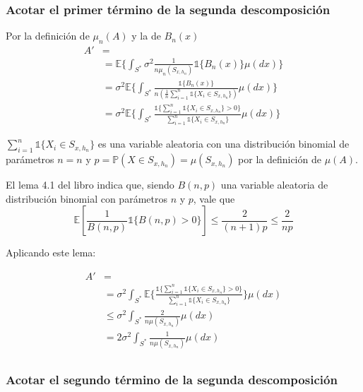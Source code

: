 \documentclass[12pt, a4paper]{article}
\begin{document}
\subsubsection{Acotar el primer término de la segunda descomposición}
Por la definición de $\mu_n(A)$ y la de $B_n(x)$
$$
\begin{aligned}
  A' &= \\
  &=\mathds{E} \Bigg\{ \int_{S^{*}} \sigma^2 \frac{ 1 }{n \mu_n(S_{x,h_n})} \mathds{1} \{ B_n(x)\} \mu(dx) \Bigg\} \\
  &=\sigma^2 \mathds{E} \Bigg\{ \int_{S^{*}}  \frac{ \mathds{1} \{ B_n(x)\} }{n (\frac{1}{n} \sum_{i=1}^n \mathds{1}\{ X_i \in S_{x,h_n} \})}  \mu(dx) \Bigg\} \\
  &=\sigma^2 \mathds{E} \Bigg\{ \int_{S^{*}}  \frac{ \mathds{1} \{ 
    \sum_{i=1}^n \mathds{1}\{ X_i \in S_{x,h_n} \}>0  
  \} }{ \sum_{i=1}^n \mathds{1}\{ X_i \in S_{x,h_n} \}}  \mu(dx) \Bigg\}
\end{aligned}
$$

$\sum_{i=1}^n \mathds{1}\{ X_i \in S_{x,h_n} \}$ es una variable aleatoria con una distribución binomial de parámetros $n=n$ y $p=\mathds{P}( X \in S_{x,h_n} )=\mu(S_{x,h_n})$ por la definición de $\mu(A)$.

El lema 4.1 del libro indica que, siendo $B(n,p)$ una variable aleatoria de distribución binomial con parámetros $n$ y $p$, vale que 
$$
\mathds{E}[\frac{1}{B(n,p)} \mathds{1} \{ B(n,p)>0 \}] \leq \frac{2}{(n+1)p} \leq \frac{2}{np}
$$

Aplicando este lema:

$$
\begin{aligned}
  A' &= \\
  &= \sigma^2 \int_{S^{*}} \mathds{E} \Bigg\{   \frac{ \mathds{1} \{ 
    \sum_{i=1}^n \mathds{1}\{ X_i \in S_{x,h_n} \}>0  
  \} }{ \sum_{i=1}^n \mathds{1}\{ X_i \in S_{x,h_n} \}} \Bigg\} \mu(dx) \\
  &\leq \sigma^2 \int_{S^{*}} \frac{2}{n\mu(S_{x,h_n})}\mu(dx) \\
  &= 2 \sigma^2 \int_{S^{*}} \frac{1}{n\mu(S_{x,h_n})}\mu(dx) \\
\end{aligned}
$$

\subsubsection{Acotar el segundo término de la segunda descomposición}
\end{document}
